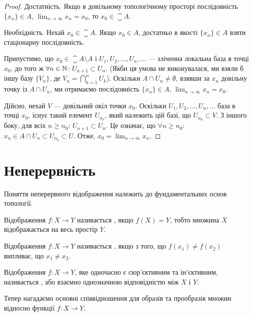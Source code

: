 \begin{proof}
Достатність. Якщо в довільному
топологічному просторі послідовність $\{x_n\} \in A$, $\lim_{n \to \infty} x_n = x_0$, то $x_0 \in \closure{A}$.

Необхідність. Нехай $x_0 \in \closure{A}$. Якщо $x_0 \in A$, достатньо в
якості $\{x_n\} \in A$ взяти стаціонарну послідовність.

Припустимо, що $x_0 \in \closure{A} \setminus A$ і $U_1, U_2, \ldots, U_n, \ldots$
--- зліченна локальна база в точці $x_0$, до того ж $\forall n \in \mathbb{N}$:
$U_{n + 1} \subset U_n$. (Якби ця умова не виконувалася, ми взяли б іншу базу
$\{V_n\}$, де $V_n = \bigcap_{k = 1}^n U_k$). Оскільки $A \cap U_n \ne \emptyset$,
взявши за $x_n$ довільну точку із $A \cap U_n$, ми отримаємо послідовність
$\{x_n\} \in A$, $\lim_{n \to \infty} x_n = x_0$.

Дійсно, нехай $V$ --- довільний окіл точки $x_0$. Оскільки
$U_1, U_2, \ldots, U_n, \ldots$ база в точці $x_0$, існує такий елемент
$U_{n_0}$, який належить цій базі, що $U_{n_0} \subset V$. З іншого боку, для всіх
$n \ge n_0$: $U_{n + 1} \subset U_n$. Це означає, що $\forall n \ge n_0$:
$x_n \in A \cap U_n \subset U_{n_0} \subset U$. Отже, $x_0 = \lim_{n \to \infty} x_n$.
\end{proof}

\section{Неперервність}

Поняття неперервного відображення належить до
фундаментальних основ топології.

\begin{definition}
Відображення $f: X \to Y$ називається
, якщо $f(X) = Y$, тобто множина $X$
відображається на весь простір $Y$.
\end{definition}

\begin{definition}
Відображення $f: X \to Y$ називається
, якщо з того, що $f(x_1) \ne f(x_2)$ випливає, що
$x_1 \ne x_2$.
\end{definition}

\begin{definition}
Відображення $f: X \to Y$, яке одночасно є
сюр'єктивним та ін'єктивним, називається ,
або взаємно однозначною відповідністю між $X$ і $Y$.
\end{definition}

Тепер нагадаємо основні співвідношення для образів та
прообразів множин відносно функції $f: X \to Y$.

